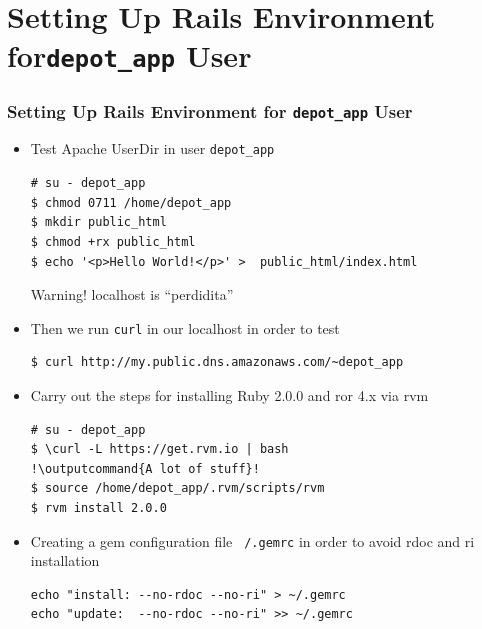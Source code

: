 \documentclass{beamer}
\newcommand{\outputcommand}[1]{\color{darkgreen}{#1}}
\begin{document}
\section{Setting Up Rails Environment for\texttt{depot\_app} User}
\begin{frame}
\frametitle{Setting Up Rails Environment for \texttt{depot\_app} User}
\begin{itemize}

\item Test Apache UserDir in user \texttt{depot\_app}
\lstset{language=shell, escapechar=!}
\begin{lstlisting}[escapechar=&]
# su - depot_app
$ chmod 0711 /home/depot_app
$ mkdir public_html
$ chmod +rx public_html
$ echo '<p>Hello World!</p>' >  public_html/index.html
\end{lstlisting}

\begin{block}{Warning!}
  localhost is ``perdidita''
\end{block}
\item Then we run \texttt{curl} in our \alert{localhost} in order to test 

\begin{lstlisting}[escapechar=&]
$ curl http://my.public.dns.amazonaws.com/~depot_app
\end{lstlisting}

\item Carry out the steps for installing Ruby 2.0.0 and \acrshort{ror} 4.x via \acrshort{rvm}

\lstset{language=shell, escapechar=!}
\begin{lstlisting}[escapechar=!]
# su - depot_app
$ \curl -L https://get.rvm.io | bash
!\outputcommand{A lot of stuff}!
$ source /home/depot_app/.rvm/scripts/rvm
$ rvm install 2.0.0
\end{lstlisting}

\item Creating a gem configuration file \texttt{~/.gemrc} in order to avoid rdoc and ri installation

\lstset{language=shell, escapechar=!}
\begin{lstlisting}[escapechar=!]
echo "install: --no-rdoc --no-ri" > ~/.gemrc
echo "update:  --no-rdoc --no-ri" >> ~/.gemrc
\end{lstlisting}
\end{itemize}
\end{frame}
\end{document}
